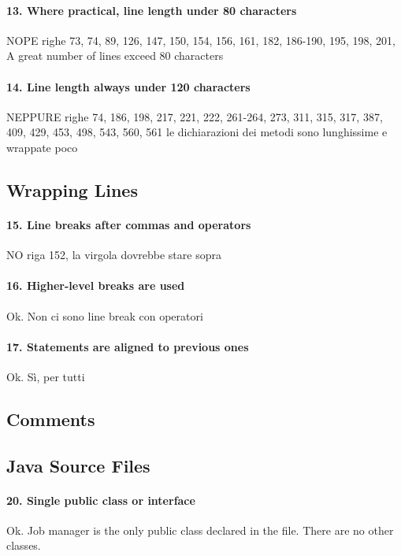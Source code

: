 \documentclass[english]{article}
\begin{document}
\paragraph{13. Where practical, line length under 80 characters}
NOPE
righe 73, 74, 89, 126, 147, 150, 154, 156, 161, 182, 186-190, 195, 198, 201, 
A great number of lines exceed 80 characters

\paragraph{14. Line length always under 120 characters}
NEPPURE
righe 74, 186, 198, 217, 221, 222, 261-264, 273, 311, 315, 317, 387, 409, 429, 453, 498, 543, 560, 561
le dichiarazioni dei metodi sono lunghissime e wrappate poco

\subsection{Wrapping Lines}
\paragraph{15. Line breaks after commas and operators}
NO
riga 152, la virgola dovrebbe stare sopra %

\paragraph{16. Higher-level breaks are used}
Ok.
Non ci sono line break con operatori

\paragraph{17. Statements are aligned to previous ones}
Ok.
Sì, per tutti

\subsection{Comments}

\subsection{Java Source Files}
\paragraph{20. Single public class or interface}
Ok.
Job manager is the only public class declared in the file.
There are no other classes.
\end{document}

